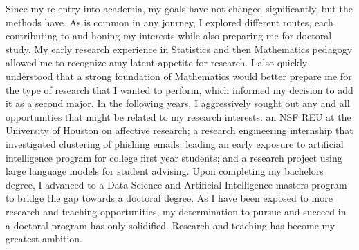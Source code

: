 \documentclass[12pt]{article}
\begin{document}
Since my re-entry into academia, my goals have not changed significantly, but the methods have. As is common in any journey, I explored
different routes, each contributing to and honing my interests while also preparing me for doctoral study.  My early research experience in
Statistics and then Mathematics pedagogy allowed me to recognize amy latent appetite for research.  I also quickly understood that a strong
foundation of Mathematics would better prepare me for the type of research that I wanted to perform, which informed my decision to add it as
a second major.  In the following years, I aggressively sought out any and all opportunities that might be related to my research
interests: an NSF REU at the University of Houston on affective research; a research engineering internship that investigated clustering of
phishing emails; leading an early exposure to artificial intelligence program for college first year students; and a research project using
large language models for student advising.  Upon completing my bachelors degree, I advanced to a Data Science and Artificial Intelligence
masters program to bridge the gap towards a doctoral degree.  As I have been exposed to more research and teaching opportunities, my
determination to pursue and succeed in a doctoral program has only solidified.  Research and teaching has become my greatest ambition.
\end{document}
